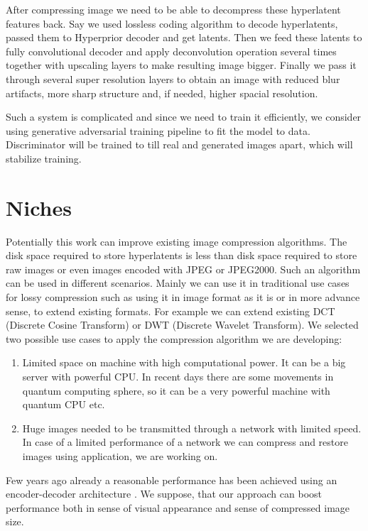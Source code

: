 After compressing image we need to be able to decompress these hyperlatent features back. Say we used lossless coding algorithm to decode hyperlatents, passed them to Hyperprior decoder and get latents. Then we feed these latents to fully convolutional decoder and apply deconvolution operation several times together with upscaling layers to make resulting image bigger. Finally we pass it through several super resolution layers to obtain an image with reduced blur artifacts, more sharp structure and, if needed, higher spacial resolution.

Such a system is complicated and since we need to train it efficiently, we consider using generative adversarial training pipeline to fit the model to data. Discriminator will be trained to till real and generated images apart, which will stabilize training.

\chapter{Niches}

Potentially this work can improve existing image compression algorithms. The disk space required to store hyperlatents is less than disk space required to store raw images or even images encoded with JPEG or JPEG2000. Such an algorithm can be used in different scenarios. Mainly we can use it in traditional use cases for lossy compression such as using it in image format as it is or in more advance sense, to extend existing formats. For example we can extend existing DCT (Discrete Cosine Transform) or DWT (Discrete Wavelet Transform). We selected two possible use cases to apply the compression algorithm we are developing:

\begin{enumerate}
    \item Limited space on machine with high computational power. It can be a big server with powerful CPU. In recent days there are some movements in quantum computing sphere, so it can be a very powerful machine with quantum CPU etc.
    \item Huge images needed to be transmitted through a network with limited speed. In case of a limited performance of a network we can compress and restore images using application, we are working on.
\end{enumerate}

Few years ago already a reasonable performance has been achieved using an encoder-decoder architecture \cite{Theis_Shi_Cunningham_Huszar_2017}. We suppose, that our approach can boost performance both in sense of visual appearance and sense of compressed image size.

